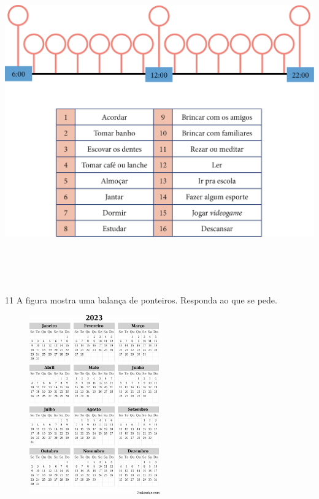 \includegraphics[width=5.28125in,height=5.51714in]{media/image51.png}


\num{11} A figura mostra uma balança de ponteiros. Responda ao que se pede.


\includegraphics[width=3.04167in,height=3.04167in]{media/image52.png}

